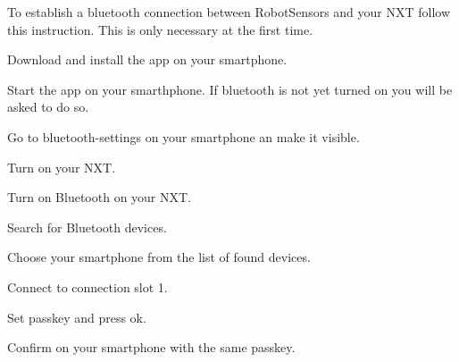 To establish a bluetooth connection between Robot\-Sensors and your N\-X\-T follow this instruction. This is only necessary at the first time.
\begin{DoxyEnumerate}
\item Download and install the app on your smartphone.
\item Start the app on your smarthphone. If bluetooth is not yet turned on you will be asked to do so.
\item Go to bluetooth-\/settings on your smartphone an make it visible.
\item Turn on your N\-X\-T.
\item Turn on Bluetooth on your N\-X\-T.
\item Search for Bluetooth devices.
\item Choose your smartphone from the list of found devices.
\item Connect to connection slot 1.
\item Set passkey and press ok.
\item Confirm on your smartphone with the same passkey. 
\end{DoxyEnumerate}